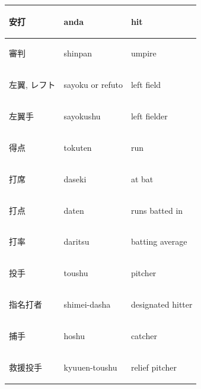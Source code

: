 \begin{table}[!ht]
\begin{center}
\begin{tabular}{lll}
			\begin{CJK}{UTF8}{min}安打 \end{CJK} &anda                            & hit                 \\\hline
			\begin{CJK}{UTF8}{min}審判 \end{CJK} &shinpan                         & umpire              \\\hline
			\begin{CJK}{UTF8}{min}左翼,  レフト \end{CJK} &sayoku or refuto          & left field          \\\hline
			\begin{CJK}{UTF8}{min}左翼手 \end{CJK} &sayokushu                      & left fielder        \\\hline
			\begin{CJK}{UTF8}{min}得点 \end{CJK} &tokuten                         & run                 \\\hline
			\begin{CJK}{UTF8}{min}打席 \end{CJK} &daseki                          & at bat              \\\hline
			\begin{CJK}{UTF8}{min}打点 \end{CJK} &daten                           & runs batted in      \\\hline
			\begin{CJK}{UTF8}{min}打率 \end{CJK} &daritsu                         & batting average     \\\hline
			\begin{CJK}{UTF8}{min}投手 \end{CJK} &toushu                          & pitcher             \\\hline
			\begin{CJK}{UTF8}{min}指名打者 \end{CJK} &shimei-dasha                  & designated hitter   \\\hline
			\begin{CJK}{UTF8}{min}捕手 \end{CJK} &hoshu                           & catcher             \\\hline
			\begin{CJK}{UTF8}{min}救援投手 \end{CJK} &kyuuen-toushu                 & relief pitcher      \\\hline

\end{tabular}
\end{center}
\end{table}
